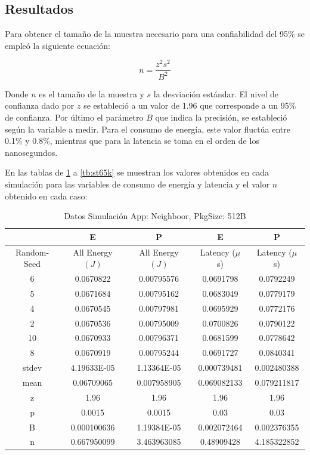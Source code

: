 \subsection{Resultados}

Para obtener el tamaño de la muestra necesario para una confiabilidad del 
95\% se empleó la siguiente ecuación: 

\begin{equation}
n=\frac{z^2 s^2}{B^2}
\label{eq:muestra}
\end{equation} 

Donde $n$ es el tamaño de la muestra y $s$ la desviación estándar.
El nivel de confianza dado por $z$ se estableció a un valor de 1.96 que corresponde
a un 95\% de confianza. Por último el parámetro $B$ que indica la precisión,
se estableció según la variable a medir. Para el consumo de energía, este valor
fluctúa entre 0.1\% y 0.8\%, mientras que para la latencia se toma en el orden de 
los nanosegundos.

En las tablas de \ref{tb:sn512} a \ref{tb:st65k} se muestran los valores obtenidos en cada simulación
para las variables de consumo de energía y latencia y el valor $n$ obtenido en cada caso:

\begin{table}[H]
\centering
\begin{tabular}{|c|c|c|c|c|}
\hline
 &E&P&E&P\\
\hline
Random-Seed&All Energy $(J)$&All Energy $(J)$&Latency ($\mu$ s)&Latency ($\mu$ s)\\
\hline
6&0.0670822&0.00795576&0.0691798&0.0792249\\
5&0.0671684&0.00795162&0.0683049&0.0779179\\
4&0.0670545&0.00797981&0.0695929&0.0772176\\
2&0.0670536&0.00795009&0.0700826&0.0790122\\
10&0.0670933&0.00796371&0.0681599&0.0778642\\
8&0.0670919&0.00795244&0.0691727&0.0840341\\
\hline
stdev&4.19633E-05&1.13364E-05&0.000739481&0.002480388\\
mean&0.06709065&0.007958905&0.069082133&0.079211817\\
z&1.96&1.96&1.96&1.96\\
p&0.0015&0.0015&0.03&0.03\\
B&0.000100636&1.19384E-05&0.002072464&0.002376355\\
\hline
n&0.667950099&3.463963085&0.48909428&4.185322852\\
\hline
\end{tabular}
\caption{Datos Simulación App: Neighboor, PkgSize: 512B}
\label{tb:sn512}
\end{table}

